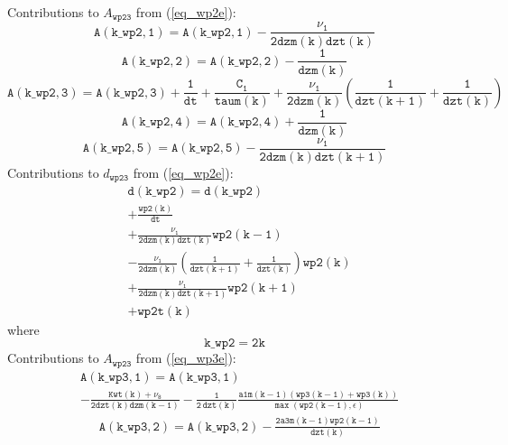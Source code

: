 \documentclass[11pt,fleqn]{article}
\begin{document}
Contributions to $A_{\mathtt{wp23}}$ from (\ref{eq_wp2e}):
%
\begin{equation}
\mathtt{ A(k\_wp2,1) = A(k\_wp2,1) -\frac{\nu_1}{2 dzm(k)dzt(k)} }
\end{equation}
%
\begin{equation}
\mathtt{ A(k\_wp2,2) = A(k\_wp2,2) - \frac{1}{dzm(k)} }
\end{equation}
%
\begin{equation}
\mathtt{ 
 A(k\_wp2,3) 
 = A(k\_wp2,3) 
 +\frac{1}{dt}
 +\frac{C_1}{taum(k)}
 +\frac{\nu_1}{2 dzm(k)} \left( \frac{1}{dzt(k+1)} + \frac{1}{dzt(k)} \right) }
\end{equation}
%
\begin{equation}
\mathtt{ A(k\_wp2,4) = A(k\_wp2,4) + \frac{1}{dzm(k)} }
\end{equation}
%
\begin{equation}
\mathtt{ A(k\_wp2,5) = A(k\_wp2,5) -\frac{\nu_1}{2 dzm(k)dzt(k+1)} }
\end{equation}
%
Contributions to $d_{\mathtt{wp23}}$ from (\ref{eq_wp2e}):
%
\begin{equation}
\begin{split}
& \mathtt{ d(k\_wp2) = d(k\_wp2) } \\
& \mathtt{
  +\frac{wp2(k)}{dt}
  } \\
& \mathtt{
  +\frac{\nu_1}{2 dzm(k)dzt(k)} wp2(k-1)
  } \\
& \mathtt{
  -\frac{\nu_1}{2 dzm(k)} \left( \frac{1}{dzt(k+1)} + \frac{1}{dzt(k)} \right) wp2(k)
  } \\
& \mathtt{
  +\frac{\nu_1}{2 dzm(k)dzt(k+1)} wp2(k+1)
  } \\
& \mathtt{
  + wp2t(k)
 }
\end{split}
\end{equation}
%
where
%
\begin{equation}
\mathtt{ k\_wp2 = 2 k}
\end{equation}
%
Contributions to $A_{\mathtt{wp23}}$ from (\ref{eq_wp3e}):
%
\begin{equation}
\begin{split}
& \mathtt{ A(k\_wp3,1) = A(k\_wp3,1) }\\
& \mathtt{
- \frac{Kwt(k) + \nu_8}{2dzt(k)dzm(k-1)} 
- \frac{1}{2 \, dzt(k)}
  \frac{ a1m(k-1)
         \left(wp3(k-1)+wp3(k)\right) }
       { \max\left( wp2(k-1), \epsilon \right) }
}
\end{split}
\end{equation}
%
\begin{equation}
\begin{split}
& \mathtt{ A(k\_wp3,2) = A(k\_wp3,2) 
  - \frac{2 a3m(k-1) wp2(k-1)}{dzt(k)}
  }
\end{split}
\end{equation}
\end{document}
